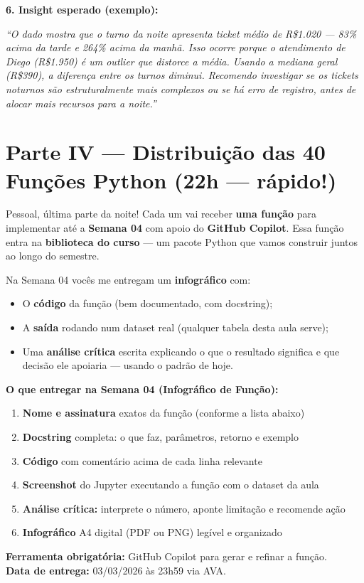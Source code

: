 \begin{SolvedBox}
\textbf{6. Insight esperado (exemplo):}
\begin{center}
\textit{``O dado mostra que o turno da noite apresenta ticket médio de R\$1.020 —
83\% acima da tarde e 264\% acima da manhã. Isso ocorre porque o atendimento de
Diego (R\$1.950) é um outlier que distorce a média. Usando a mediana geral
(R\$390), a diferença entre os turnos diminui. Recomendo investigar se os
tickets noturnos são estruturalmente mais complexos ou se há erro de registro,
antes de alocar mais recursos para a noite.''}  
\end{center}
\end{SolvedBox}

\section{Parte IV — Distribuição das 40 Funções Python (22h — rápido!)}

Pessoal, última parte da noite! Cada um vai receber \textbf{uma função} para
implementar até a \textbf{Semana 04} com apoio do \textbf{GitHub Copilot}.
Essa função entra na \textbf{biblioteca do curso} — um pacote Python que vamos
construir juntos ao longo do semestre.

Na Semana 04 vocês me entregam um \textbf{infográfico} com:
\begin{itemize}
  \item O \textbf{código} da função (bem documentado, com docstring);
  \item A \textbf{saída} rodando num dataset real (qualquer tabela desta aula serve);
  \item Uma \textbf{análise crítica} escrita explicando o que o resultado
  significa e que decisão ele apoiaria — usando o padrão de hoje.
\end{itemize}

\begin{SolvedBox}
\textbf{O que entregar na Semana 04 (Infográfico de Função):}
\begin{enumerate}
  \item \textbf{Nome e assinatura} exatos da função (conforme a lista abaixo)
  \item \textbf{Docstring} completa: o que faz, parâmetros, retorno e exemplo
  \item \textbf{Código} com comentário acima de cada linha relevante
  \item \textbf{Screenshot} do Jupyter executando a função com o dataset da aula
  \item \textbf{Análise crítica:} interprete o número, aponte limitação e recomende ação
  \item \textbf{Infográfico} A4 digital (PDF ou PNG) legível e organizado
\end{enumerate}
\textbf{Ferramenta obrigatória:} GitHub Copilot para gerar e refinar a função.\\
\textbf{Data de entrega:} 03/03/2026 às 23h59 via AVA.
\end{SolvedBox}

